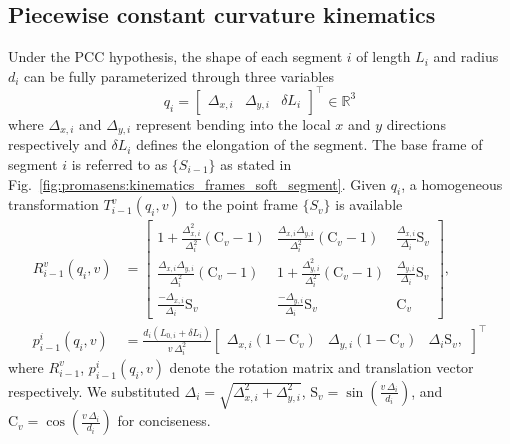 \subsection{Piecewise constant curvature kinematics}\label{sub:promasens:kinematic_model_pcc}

Under the \gls{PCC} hypothesis, the shape of each segment $i$ of length $L_{i}$ and radius $d_i$ can be fully parameterized through three variables
\begin{equation}
    q_i = \begin{bmatrix}\Delta_{x,i} & \Delta_{y,i} & \delta L_{i} \end{bmatrix}^{\top} \in \mathbb{R}^3
\end{equation}
where $\Delta_{x,i}$ and $\Delta_{y,i}$ represent bending into the local $x$ and $y$ directions respectively and $\delta L_i$ defines the elongation of the segment.
The base frame of segment $i$ is referred to as $\{S_{i-1}\}$ as stated in Fig.~\ref{fig:promasens:kinematics_frames_soft_segment}. Given $q_i$, a homogeneous transformation $T_{i-1}^{v}(q_i, v)$ to the point frame $\{S_{v}\}$ is available
\begin{equation}
\label{eq:promasens:transform_improved_q}
\begin{split}
    R_{i-1}^{v}(q_i,v) &=
    \begin{bmatrix}
        1 + \frac{\Delta_{x,i}^2}{\Delta_{i}^2} \left ( \mathrm{C}_v - 1 \right ) & \frac{\Delta_{x,i} \Delta_{y,i}}{\Delta_{i}^2} \left ( \mathrm{C}_v - 1 \right ) & \frac{\Delta_{x,i}}{\Delta_i} \mathrm{S}_v\\
        \frac{\Delta_{x,i} \Delta_{y,i}}{\Delta_{i}^2} \left ( \mathrm{C}_v - 1 \right ) & 1 + \frac{\Delta_{y,i}^2}{\Delta_{i}^2} \left ( \mathrm{C}_v - 1 \right ) & \frac{\Delta_{y,i}}{\Delta_i} \mathrm{S}_v\\
        \frac{-\Delta_{x,i}}{\Delta_i} \mathrm{S}_v & \frac{-\Delta_{y,i}}{\Delta_i} \mathrm{S}_v & \mathrm{C}_v
    \end{bmatrix},\\
    p_{i-1}^{i}(q_i,v) &= \frac{d_i ( L_{0,i}+\delta L_i)}{v \, \Delta_i^2}
    \begin{bmatrix}
        \Delta_{x,i} (1 - \mathrm{C}_v) & \Delta_{y,i} (1 - \mathrm{C}_v) & \Delta_{i} \mathrm{S}_v,
    \end{bmatrix}^{\top}
\end{split}
\end{equation}
where $R_{i-1}^{v}$, $p_{i-1}^{i}(q_i,v)$ denote the rotation matrix and translation vector respectively. We substituted $\Delta_i = \sqrt{\Delta_{x,i}^2 + \Delta_{y,i}^2}$, $\mathrm{S}_v = \sin \left (\frac{v \, \Delta_i}{d_i} \right )$, and $\mathrm{C}_v = \cos \left ( \frac{v \, \Delta_i}{d_i} \right )$ for conciseness.

